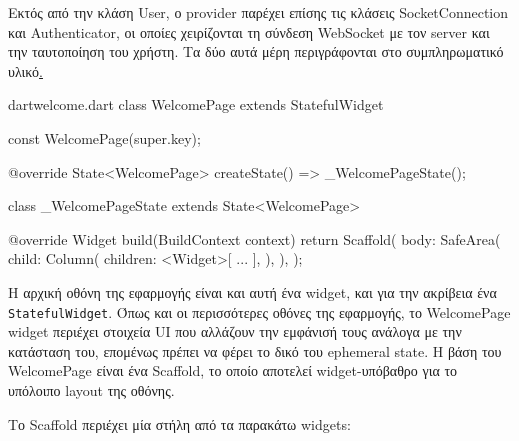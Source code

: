 \documentclass[../thesis.tex]{subfiles}
\begin{document}
Εκτός από την κλάση User, ο provider παρέχει επίσης τις κλάσεις SocketConnection και Authenticator, οι οποίες χειρίζονται τη σύνδεση WebSocket με τον server και την ταυτοποίηση του χρήστη.
Τα δύο αυτά μέρη περιγράφονται στο συμπληρωματικό υλικό\hyperref[sec:authentication].

\begin{codeblock}{dart}{welcome.dart}
  class WelcomePage extends StatefulWidget {
    const WelcomePage({super.key});
  
    @override
    State<WelcomePage> createState() => _WelcomePageState();
  }

  class _WelcomePageState extends State<WelcomePage> {

    @override
    Widget build(BuildContext context) {
      return Scaffold(
        body: SafeArea(
          child: Column(
            children: <Widget>[
              ...
            ],
          ),
        ),
      );
    }
  }
\end{codeblock}

Η αρχική οθόνη της εφαρμογής είναι και αυτή ένα widget, και για την ακρίβεια ένα \texttt{StatefulWidget}.
Όπως και οι περισσότερες οθόνες της εφαρμογής, το WelcomePage widget περιέχει στοιχεία UI που αλλάζουν την εμφάνισή τους ανάλογα με την κατάσταση του, επομένως πρέπει να φέρει το δικό του ephemeral state.
Η βάση του WelcomePage είναι ένα Scaffold, το οποίο αποτελεί widget-υπόβαθρο για το υπόλοιπο layout της οθόνης.

Το Scaffold περιέχει μία στήλη από τα παρακάτω widgets:
\end{document}
